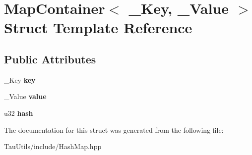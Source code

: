 \hypertarget{struct_map_container}{}\section{Map\+Container$<$ \+\_\+\+Key, \+\_\+\+Value $>$ Struct Template Reference}
\label{struct_map_container}
\subsection*{Public Attributes}
\begin{DoxyCompactItemize}
\item 
\mbox{\label{struct_map_container_adb8cb38c4e31bcc2712d5ac44b4000c3}} 
\+\_\+\+Key {\bfseries key}
\item 
\mbox{\label{struct_map_container_adde3d3d72da198c5026e65c4789ae016}} 
\+\_\+\+Value {\bfseries value}
\item 
\mbox{\label{struct_map_container_a67a565258ba805350e0a2f3c6e0bdada}} 
u32 {\bfseries hash}
\end{DoxyCompactItemize}


The documentation for this struct was generated from the following file\+:\begin{DoxyCompactItemize}
\item 
Tau\+Utils/include/Hash\+Map.\+hpp\end{DoxyCompactItemize}
